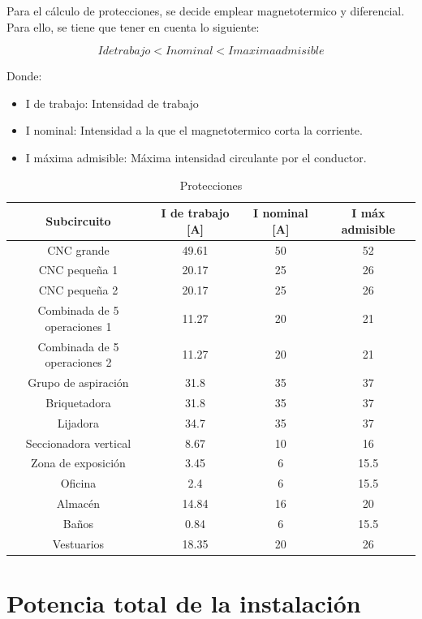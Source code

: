 \documentclass[../main.tex]{subfiles}
\begin{document}
Para el cálculo de protecciones, se decide emplear magnetotermico y diferencial. Para ello, se tiene que tener en cuenta lo siguiente:

\begin{equation}
    I de trabajo < I nominal < I maxima admisible
\end{equation}

Donde:
\begin{itemize}
    \item I de trabajo: Intensidad de trabajo
    \item I nominal: Intensidad a la que el magnetotermico corta la corriente.
    \item I máxima admisible: Máxima intensidad circulante por el conductor.
\end{itemize}

\begin{table}[H]
    \centering
    \begin{tabular}{c|c|c|c}
    Subcircuito & I de trabajo [A] & I nominal [A] & I máx admisible  \\ \hline
    CNC grande & 49.61 & 50 & 52 \\
    CNC pequeña 1 & 20.17 & 25 & 26 \\
    CNC pequeña 2 & 20.17 & 25 & 26 \\
    Combinada de 5 operaciones 1 & 11.27 & 20 & 21 \\
    Combinada de 5 operaciones 2 & 11.27 & 20 & 21 \\
    Grupo de aspiración & 31.8 & 35 & 37 \\
    Briquetadora & 31.8 & 35 & 37 \\
    Lijadora & 34.7 & 35 & 37 \\
    Seccionadora vertical & 8.67 & 10 & 16 \\
    Zona de exposición & 3.45 & 6 & 15.5 \\ 
    Oficina & 2.4 & 6 & 15.5 \\
    Almacén & 14.84 & 16 & 20 \\
    Baños & 0.84 & 6 & 15.5 \\
    Vestuarios & 18.35 & 20 & 26 \\    
    \end{tabular}
    \caption{Protecciones}
\end{table}


\section{Potencia total de la instalación}
\end{document}
